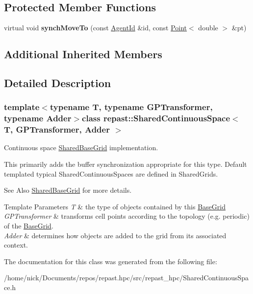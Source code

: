 \subsection*{Protected Member Functions}
\begin{DoxyCompactItemize}
\item 
\hypertarget{classrepast_1_1_shared_continuous_space_afcec67affcb216e1d1e0d558acfc3557}{virtual void {\bfseries synch\-Move\-To} (const \hyperlink{classrepast_1_1_agent_id}{Agent\-Id} \&id, const \hyperlink{classrepast_1_1_point}{Point}$<$ double $>$ \&pt)}\label{classrepast_1_1_shared_continuous_space_afcec67affcb216e1d1e0d558acfc3557}

\end{DoxyCompactItemize}
\subsection*{Additional Inherited Members}


\subsection{Detailed Description}
\subsubsection*{template$<$typename T, typename G\-P\-Transformer, typename Adder$>$class repast\-::\-Shared\-Continuous\-Space$<$ T, G\-P\-Transformer, Adder $>$}

Continuous space \hyperlink{classrepast_1_1_shared_base_grid}{Shared\-Base\-Grid} implementation. 

This primarily adds the buffer synchronization appropriate for this type. Default templated typical Shared\-Continuous\-Spaces are defined in Shared\-Grids.

\begin{DoxySeeAlso}{See Also}
\hyperlink{classrepast_1_1_shared_base_grid}{Shared\-Base\-Grid} for more details.
\end{DoxySeeAlso}

\begin{DoxyTemplParams}{Template Parameters}
{\em T} & the type of objects contained by this \hyperlink{classrepast_1_1_base_grid}{Base\-Grid} \\
\hline
{\em G\-P\-Transformer} & transforms cell points according to the topology (e.\-g. periodic) of the \hyperlink{classrepast_1_1_base_grid}{Base\-Grid}. \\
\hline
{\em Adder} & determines how objects are added to the grid from its associated context. \\
\hline
\end{DoxyTemplParams}


The documentation for this class was generated from the following file\-:\begin{DoxyCompactItemize}
\item 
/home/nick/\-Documents/repos/repast.\-hpc/src/repast\-\_\-hpc/Shared\-Continuous\-Space.\-h\end{DoxyCompactItemize}
